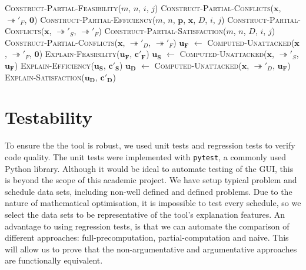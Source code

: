 \begin{algorithm}[H]
	\caption{}
	\begin{algorithmic}[1]
				\State \Return \textsc{Construct-Partial-Feasibility}($m$, $n$, $i$, $j$)
			\EndFunction
				\State \Return \textsc{Construct-Partial-Conflicts}($\mathbf{x}$, $\twoheadrightarrow'_F$, $\mathbf{0}$)
			\EndFunction
				\State \Return \textsc{Construct-Partial-Efficiency}($m$, $n$, $\mathbf{p}$, $\mathbf{x}$, $D$, $i$, $j$)
			\EndFunction
				\State \Return \textsc{Construct-Partial-Conflicts}($\mathbf{x}$, $\twoheadrightarrow'_S$, $\twoheadrightarrow'_F$)
			\EndFunction
				\State \Return \textsc{Construct-Partial-Satisfaction}($m$, $n$, $D$, $i$, $j$)
			\EndFunction
				\State \Return \textsc{Construct-Partial-Conflicts}($\mathbf{x}$, $\twoheadrightarrow'_D$, $\twoheadrightarrow'_F$)
			\EndFunction
			\State $\mathbf{u_F}$ $\gets$ \textsc{Computed-Unattacked}($\mathbf{x}$, $\twoheadrightarrow'_F$, $\mathbf{0}$)
			\State \textsc{Explain-Feasibility}($\mathbf{u_F}$, $\mathbf{c'_F}$)
			\State $\mathbf{u_S}$ $\gets$ \textsc{Computed-Unattacked}($\mathbf{x}$, $\twoheadrightarrow'_S$, $\mathbf{u_F}$)
			\State \textsc{Explain-Efficiency}($\mathbf{u_S}$, $\mathbf{c'_S}$)
			\State $\mathbf{u_D}$ $\gets$ \textsc{Computed-Unattacked}($\mathbf{x}$, $\twoheadrightarrow'_D$, $\mathbf{u_F}$)
			\State \textsc{Explain-Satisfaction}($\mathbf{u_D}$, $\mathbf{c'_D}$)
		\EndFunction
	\end{algorithmic}
\end{algorithm}

\section{Testability}

To ensure the the tool is robust, we used unit tests and regression tests to verify code quality. The unit tests were implemented with \texttt{pytest}, a commonly used Python library. Although it would be ideal to automate testing of the GUI, this is beyond the scope of this academic project. We have setup typical problem and schedule data sets, including non-well defined and defined problems. Due to the nature of mathematical optimisation, it is impossible to test every schedule, so we select the data sets to be representative of the tool's explanation features. An advantage to using regression tests, is that we can automate the comparison of different approaches: full-precomputation, partial-computation and naive. This will allow us to prove that the non-argumentative and argumentative approaches are functionally equivalent.